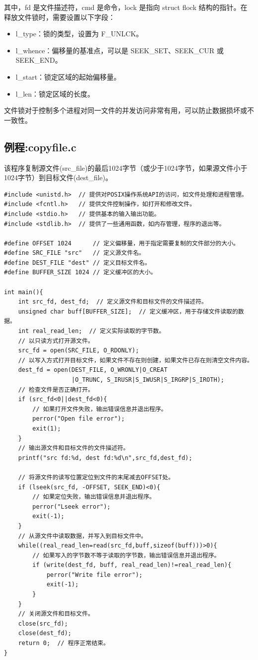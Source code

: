 \documentclass[12pt, a4paper, oneside]{ctexbook}
\numberwithin{figure}{section}
\begin{document}
其中，fd 是文件描述符，cmd 是命令，lock 是指向 struct flock 结构的指针。在释放文件锁时，需要设置以下字段：

\begin{itemize}
\item l_type：锁的类型，设置为 F_UNLCK。
\item l_whence：偏移量的基准点，可以是 SEEK_SET、SEEK_CUR 或 SEEK_END。
\item l_start：锁定区域的起始偏移量。
\item l_len：锁定区域的长度。
\end{itemize}

文件锁对于控制多个进程对同一文件的并发访问非常有用，可以防止数据损坏或不一致性。


\subsection{例程:copyfile.c}

该程序复制源文件(src_file)的最后1024字节（或少于1024字节，如果源文件小于1024字节）到目标文件(dest_file)。

\begin{verbatim}
#include <unistd.h>  // 提供对POSIX操作系统API的访问，如文件处理和进程管理。
#include <fcntl.h>   // 提供文件控制操作，如打开和修改文件。
#include <stdio.h>   // 提供基本的输入输出功能。
#include <stdlib.h>  // 提供了一些通用函数，如内存管理，程序的退出等。

#define OFFSET 1024      // 定义偏移量，用于指定需要复制的文件部分的大小。
#define SRC_FILE "src"   // 定义源文件名。
#define DEST_FILE "dest" // 定义目标文件名。
#define BUFFER_SIZE 1024 // 定义缓冲区的大小。

int main(){
    int src_fd, dest_fd;  // 定义源文件和目标文件的文件描述符。
    unsigned char buff[BUFFER_SIZE];  // 定义缓冲区，用于存储文件读取的数据。
    int real_read_len;  // 定义实际读取的字节数。
    // 以只读方式打开源文件。
    src_fd = open(SRC_FILE, O_RDONLY);
    // 以写入方式打开目标文件，如果文件不存在则创建，如果文件已存在则清空文件内容。
    dest_fd = open(DEST_FILE, O_WRONLY|O_CREAT
                   |O_TRUNC, S_IRUSR|S_IWUSR|S_IRGRP|S_IROTH);
    // 检查文件是否正确打开。
    if (src_fd<0||dest_fd<0){
        // 如果打开文件失败，输出错误信息并退出程序。
        perror("Open file error");
        exit(1);
    }
    // 输出源文件和目标文件的文件描述符。
    printf("src fd:%d, dest fd:%d\n",src_fd,dest_fd);

    // 将源文件的读写位置定位到文件的末尾减去OFFSET处。
    if (lseek(src_fd, -OFFSET, SEEK_END)<0){
        // 如果定位失败，输出错误信息并退出程序。
        perror("Lseek error");
        exit(-1);
    }
    // 从源文件中读取数据，并写入到目标文件中。
    while((real_read_len=read(src_fd,buff,sizeof(buff)))>0){
        // 如果写入的字节数不等于读取的字节数，输出错误信息并退出程序。
        if (write(dest_fd, buff, real_read_len)!=real_read_len){
            perror("Write file error");
            exit(-1);
        }
    }        
    // 关闭源文件和目标文件。
    close(src_fd);
    close(dest_fd);
    return 0;  // 程序正常结束。
}

\end{verbatim}
\end{document}
